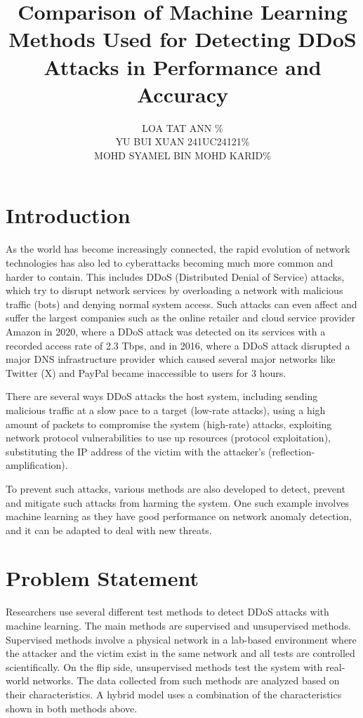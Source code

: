 \documentclass[a4paper, 12pt]{article}
\author{
LOA TAT ANN \quad 1221304731 \quad 33.33\%\\
YU BUI XUAN \quad 241UC24121\quad 33.33\%\\
MOHD SYAMEL BIN MOHD KARID\quad 1221309130\quad 33.33\%\\
}
\title{Comparison of Machine Learning Methods Used for Detecting DDoS Attacks in Performance and Accuracy}
\begin{document}
\maketitle

\section{Introduction}
As the world has become increasingly connected, the rapid evolution of network technologies has also led to cyberattacks becoming much more common and harder to contain. This includes DDoS (Distributed Denial of Service) attacks, which try to disrupt network services by overloading a network with malicious traffic (bots) and denying normal system access.  Such attacks can even affect and suffer the largest companies such as the online retailer and cloud service provider Amazon in 2020, where a DDoS attack was detected on its services with a recorded access rate of 2.3 Tbps, and in 2016, where a DDoS attack disrupted a major DNS infrastructure provider which caused several major networks like Twitter (X) and PayPal became inaccessible to users for 3 hours.  

There are several ways DDoS attacks the host system, including sending malicious traffic at a slow pace to a target (low-rate attacks), using a high amount of packets to compromise the system (high-rate) attacks, exploiting network protocol vulnerabilities to use up resources (protocol exploitation), substituting the IP address of the victim with the attacker's (reflection-amplification). 


To prevent such attacks, various methods are also developed to detect, prevent and mitigate such attacks from harming the system. One such example involves machine learning as they have good performance on network anomaly detection, and it can be adapted to deal with new threats. 

\section{Problem Statement}
Researchers use several different test methods to detect DDoS attacks with machine learning. The main methods are supervised and unsupervised methods. Supervised methods involve a physical network in a lab-based environment where the attacker and the victim exist in the same network and all tests are controlled scientifically. On the flip side, unsupervised methods test the system with real-world networks. The data collected from such methods are analyzed based on their characteristics. A hybrid model uses a combination of the characteristics shown in both methods above. 
\end{document}
